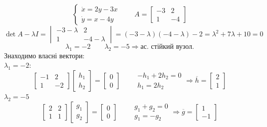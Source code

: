 \begin{example}
    $$
    \begin{cases}
    \dot{x} = 2y - 3x\\
    \dot{y} = x - 4y
    \end{cases} \qquad A = \begin{bmatrix}
     -3 & 2 \\
     1 & -4
    \end{bmatrix}
    $$
    $$
    \det{A - \lambda I} = \begin{vmatrix}
      -3 - \lambda & 2 \\
      1 & -4 - \lambda
    \end{vmatrix}  = (-3-\lambda) (-4 - \lambda) -2 = \lambda^2 + 7 \lambda + 10 = 0
    $$
    $$
    \lambda_1 = -2 \qquad \lambda_2 = -5 \Rightarrow \text{ас. стійкий вузол.}
    $$
    Знаходимо власні вектори:\\
    $\lambda_1 = -2$:
    $$
    \begin{bmatrix}
     -1 & 2 \\
     1 & -2
    \end{bmatrix} \begin{bmatrix}
     h_1 \\
     h_2
    \end{bmatrix} = \begin{bmatrix}
     0 \\
     0
    \end{bmatrix} \qquad \begin{gathered}
     -h_1 + 2h_2 = 0\\
     h_1 = 2 h_2
    \end{gathered} \Rightarrow \overline{h} = \begin{bmatrix}
     2 \\
     1
    \end{bmatrix}
    $$
    $\lambda_2 = -5$
    $$
    \begin{bmatrix}
     2 & 2 \\
     1 & 1
    \end{bmatrix} \begin{bmatrix}
     g_1 \\
     g_2
    \end{bmatrix} = \begin{bmatrix}
     0 \\
     0
    \end{bmatrix}
    \qquad \begin{gathered}
     g_1 + g_2 = 0\\
     g_1 = - g_2
    \end{gathered} \Rightarrow \overline{g} = \begin{bmatrix}
     1 \\
     -1
    \end{bmatrix}
    $$


\end{example}
